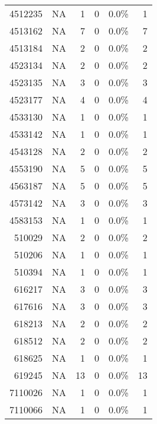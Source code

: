 \begin{longtable}{lrrrrr}
	    \multicolumn{1}{r}{4512235} & NA    & 1     & 0     & 0.0\% & 1 \\
	    \multicolumn{1}{r}{4513162} & NA    & 7     & 0     & 0.0\% & 7 \\
	    \multicolumn{1}{r}{4513184} & NA    & 2     & 0     & 0.0\% & 2 \\
	    \multicolumn{1}{r}{4523134} & NA    & 2     & 0     & 0.0\% & 2 \\
	    \multicolumn{1}{r}{4523135} & NA    & 3     & 0     & 0.0\% & 3 \\
	    \multicolumn{1}{r}{4523177} & NA    & 4     & 0     & 0.0\% & 4 \\
	    \multicolumn{1}{r}{4533130} & NA    & 1     & 0     & 0.0\% & 1 \\
	    \multicolumn{1}{r}{4533142} & NA    & 1     & 0     & 0.0\% & 1 \\
	    \multicolumn{1}{r}{4543128} & NA    & 2     & 0     & 0.0\% & 2 \\
	    \multicolumn{1}{r}{4553190} & NA    & 5     & 0     & 0.0\% & 5 \\
	    \multicolumn{1}{r}{4563187} & NA    & 5     & 0     & 0.0\% & 5 \\
	    \multicolumn{1}{r}{4573142} & NA    & 3     & 0     & 0.0\% & 3 \\
	    \multicolumn{1}{r}{4583153} & NA    & 1     & 0     & 0.0\% & 1 \\
	    \multicolumn{1}{r}{510029} & NA    & 2     & 0     & 0.0\% & 2 \\
	    \multicolumn{1}{r}{510206} & NA    & 1     & 0     & 0.0\% & 1 \\
	    \multicolumn{1}{r}{510394} & NA    & 1     & 0     & 0.0\% & 1 \\
	    \multicolumn{1}{r}{616217} & NA    & 3     & 0     & 0.0\% & 3 \\
	    \multicolumn{1}{r}{617616} & NA    & 3     & 0     & 0.0\% & 3 \\
	    \multicolumn{1}{r}{618213} & NA    & 2     & 0     & 0.0\% & 2 \\
	    \multicolumn{1}{r}{618512} & NA    & 2     & 0     & 0.0\% & 2 \\
	    \multicolumn{1}{r}{618625} & NA    & 1     & 0     & 0.0\% & 1 \\
	    \multicolumn{1}{r}{619245} & NA    & 13    & 0     & 0.0\% & 13 \\
	    \multicolumn{1}{r}{7110026} & NA    & 1     & 0     & 0.0\% & 1 \\
	    \multicolumn{1}{r}{7110066} & NA    & 1     & 0     & 0.0\% & 1 \\

\end{longtable}
